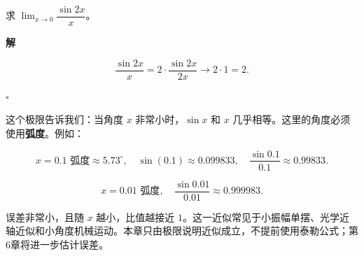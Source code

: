\documentclass[fontset=fandol]{ctexart}
\newenvironment{solution}{\par\noindent\textbf{解}\quad}{\hfill$\square$\par\vspace{0.8em}}
\begin{document}
\begin{example}

	求 \(\lim_{x \to 0} \dfrac{\sin 2x}{x}\)。

\end{example}



\begin{solution}

	\[

	\dfrac{\sin 2x}{x} = 2 \cdot \dfrac{\sin 2x}{2x} \to 2 \cdot 1 = 2.

	\]

\end{solution}





\begin{application}[物理：小角度近似]



这个极限告诉我们：当角度 \(x\) 非常小时，\(\sin x\) 和 \(x\) 几乎相等。这里的角度必须使用\textbf{弧度}。例如：



\[

x = 0.1 \text{ 弧度} \approx 5.73^\circ,\quad \sin(0.1) \approx 0.099833,\quad \dfrac{\sin 0.1}{0.1} \approx 0.99833.

\]



\[

x = 0.01 \text{ 弧度},\quad \dfrac{\sin 0.01}{0.01} \approx 0.999983.

\]



误差非常小，且随 \(x\) 越小，比值越接近 $1$。这一近似常见于小振幅单摆、光学近轴近似和小角度机械运动。本章只由极限说明近似成立，不提前使用泰勒公式；第6章将进一步估计误差。



\end{application}
\end{document}
